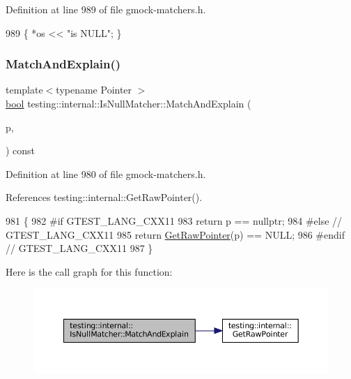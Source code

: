 Definition at line 989 of file gmock-\/matchers.\+h.


\begin{DoxyCode}
989 \{ *os << \textcolor{stringliteral}{"is NULL"}; \}
\end{DoxyCode}
\mbox{\label{classtesting_1_1internal_1_1IsNullMatcher_ab8a96a4389c9c352e367ba2edff6e87d}} 
\subsubsection{\texorpdfstring{Match\+And\+Explain()}{MatchAndExplain()}}
{\footnotesize\ttfamily template$<$typename Pointer $>$ \\
\hyperlink{classbool}{bool} testing\+::internal\+::\+Is\+Null\+Matcher\+::\+Match\+And\+Explain (\begin{DoxyParamCaption}\item[{const Pointer \&}]{p,  }\item[{\hyperlink{classtesting_1_1MatchResultListener}{Match\+Result\+Listener} $\ast$}]{ }\end{DoxyParamCaption}) const\hspace{0.3cm}{\ttfamily [inline]}}



Definition at line 980 of file gmock-\/matchers.\+h.



References testing\+::internal\+::\+Get\+Raw\+Pointer().


\begin{DoxyCode}
981                                                      \{
982 \textcolor{preprocessor}{#if GTEST\_LANG\_CXX11}
983     \textcolor{keywordflow}{return} p == \textcolor{keyword}{nullptr};
984 \textcolor{preprocessor}{#else  // GTEST\_LANG\_CXX11}
985     \textcolor{keywordflow}{return} \hyperlink{namespacetesting_1_1internal_ae88d1a6f95165c43c27a6c0e2d357e61}{GetRawPointer}(p) == NULL;
986 \textcolor{preprocessor}{#endif  // GTEST\_LANG\_CXX11}
987   \}
\end{DoxyCode}
Here is the call graph for this function\+:
\nopagebreak
\begin{figure}[H]
\begin{center}
\leavevmode
\includegraphics[width=350pt]{classtesting_1_1internal_1_1IsNullMatcher_ab8a96a4389c9c352e367ba2edff6e87d_cgraph}
\end{center}
\end{figure}


